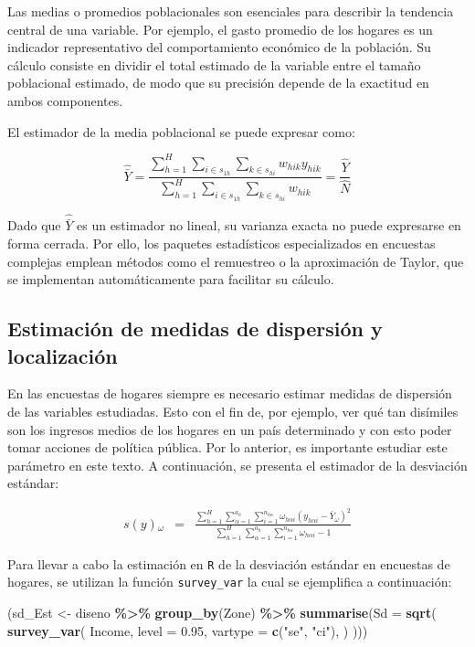\documentclass[
  12pt,
]{book}
\newenvironment{Shaded}{\begin{snugshade}}{\end{snugshade}}
\newcommand{\AttributeTok}[1]{\textcolor[rgb]{0.13,0.29,0.53}{#1}}
\newcommand{\FloatTok}[1]{\textcolor[rgb]{0.00,0.00,0.81}{#1}}
\newcommand{\FunctionTok}[1]{\textcolor[rgb]{0.13,0.29,0.53}{\textbf{#1}}}
\newcommand{\NormalTok}[1]{#1}
\newcommand{\OtherTok}[1]{\textcolor[rgb]{0.56,0.35,0.01}{#1}}
\newcommand{\SpecialCharTok}[1]{\textcolor[rgb]{0.81,0.36,0.00}{\textbf{#1}}}
\newcommand{\StringTok}[1]{\textcolor[rgb]{0.31,0.60,0.02}{#1}}
\begin{document}
Las medias o promedios poblacionales son esenciales para describir la tendencia central de una variable. Por ejemplo, el gasto promedio de los hogares es un indicador representativo del comportamiento económico de la población. Su cálculo consiste en dividir el total estimado de la variable entre el tamaño poblacional estimado, de modo que su precisión depende de la exactitud en ambos componentes.

El estimador de la media poblacional se puede expresar como:

\[
\widehat{\bar{Y}} = \frac{\displaystyle \sum_{h=1}^{H} \sum_{i \in s_{1h}} \sum_{k \in s_{hi}} w_{hik} y_{hik}} {\displaystyle \sum_{h=1}^{H} \sum_{i \in s_{1h}} \sum_{k \in s_{hi}} w_{hik}} = \frac{\hat{Y}}{\hat{N}}
\]

Dado que \(\widehat{\bar{Y}}\) es un estimador no lineal, su varianza exacta no puede expresarse en forma cerrada. Por ello, los paquetes estadísticos especializados en encuestas complejas emplean métodos como el remuestreo o la aproximación de Taylor, que se implementan automáticamente para facilitar su cálculo.

\subsection{Estimación de medidas de dispersión y localización}\label{estimaciuxf3n-de-medidas-de-dispersiuxf3n-y-localizaciuxf3n}

En las encuestas de hogares siempre es necesario estimar medidas de dispersión de las variables estudiadas. Esto con el fin de, por ejemplo, ver qué tan disímiles son los ingresos medios de los hogares en un país determinado y con esto poder tomar acciones de política pública. Por lo anterior, es importante estudiar este parámetro en este texto. A continuación, se presenta el estimador de la desviación estándar:

\begin{eqnarray}
s\left(y\right){}_{\omega} & = & \frac{\sum_{h=1}^{H}\sum_{\alpha=1}^{a_{h}}\sum_{i=1}^{n_{h\alpha}}\omega_{h\alpha i}\left(y_{h\alpha i}-\bar{Y}_{\omega}\right)^{2}}{\sum_{h=1}^{H}\sum_{\alpha=1}^{a_{h}}\sum_{i=1}^{n_{h\alpha}}\omega_{h\alpha i}-1}
\end{eqnarray}

Para llevar a cabo la estimación en \texttt{R} de la desviación estándar en encuestas de hogares, se utilizan la función \texttt{survey\_var} la cual se ejemplifica a continuación:

\begin{Shaded}
\begin{Highlighting}[]
\NormalTok{(sd\_Est }\OtherTok{\textless{}{-}}\NormalTok{ diseno }\SpecialCharTok{\%\textgreater{}\%} \FunctionTok{group\_by}\NormalTok{(Zone) }\SpecialCharTok{\%\textgreater{}\%}
   \FunctionTok{summarise}\NormalTok{(}\AttributeTok{Sd =} \FunctionTok{sqrt}\NormalTok{(}
  \FunctionTok{survey\_var}\NormalTok{(}
\NormalTok{    Income,}
    \AttributeTok{level =} \FloatTok{0.95}\NormalTok{,}
    \AttributeTok{vartype =}  \FunctionTok{c}\NormalTok{(}\StringTok{"se"}\NormalTok{, }\StringTok{"ci"}\NormalTok{),}
\NormalTok{  ) )))}
\end{Highlighting}
\end{Shaded}
\end{document}
